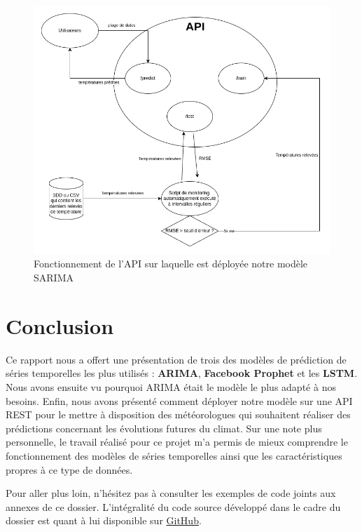 \documentclass[french]{article}
\begin{document}
    \begin{figure}[h]
        \includegraphics[width=12cm]{schema_API_E2}
        \centering
        \caption{Fonctionnement de l'API sur laquelle est déployée notre modèle SARIMA}
        \centering
    \end{figure}

    \section*{Conclusion}
    Ce rapport nous a offert une présentation de trois des modèles de prédiction de séries temporelles les plus utilisés : \textbf{ARIMA}, \textbf{Facebook Prophet} et les \textbf{LSTM}. Nous avons ensuite vu pourquoi ARIMA était le modèle le plus adapté à nos besoins. Enfin, nous avons présenté comment déployer notre modèle sur une API REST pour le mettre à disposition des météorologues qui souhaitent réaliser des prédictions concernant les évolutions futures du climat.
    Sur une note plus personnelle, le travail réalisé pour ce projet m'a permis de mieux comprendre le fonctionnement des modèles de séries temporelles ainsi que les caractéristiques propres à ce type de données.

    Pour aller plus loin, n'hésitez pas à consulter les exemples de code joints aux annexes de ce dossier. L'intégralité du code source développé dans le cadre du dossier est quant à lui disponible sur \href{https://github.com/vinpap/predict_climate_change}{GitHub}.

\end{document}
